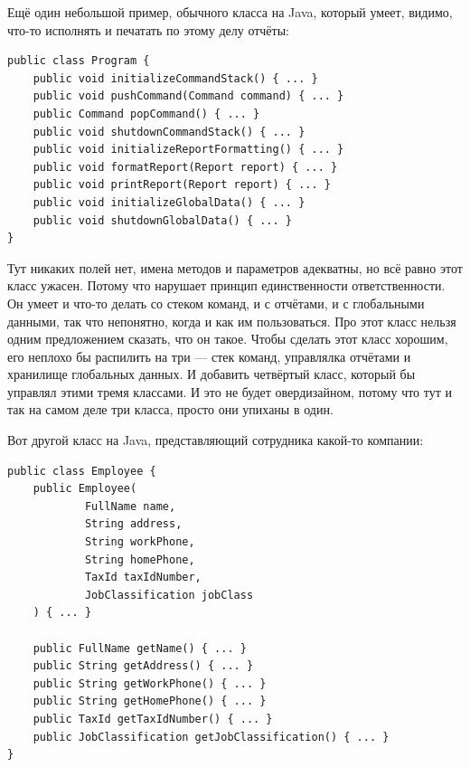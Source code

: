 \documentclass{../../text-style}
\begin{document}
Ещё один небольшой пример, обычного класса на Java, который умеет, видимо, что-то исполнять и печатать по этому делу отчёты:

\begin{verbatim}
public class Program {
    public void initializeCommandStack() { ... }
    public void pushCommand(Command command) { ... }
    public Command popCommand() { ... }
    public void shutdownCommandStack() { ... }
    public void initializeReportFormatting() { ... }
    public void formatReport(Report report) { ... }
    public void printReport(Report report) { ... }
    public void initializeGlobalData() { ... }
    public void shutdownGlobalData() { ... }
}
\end{verbatim}

Тут никаких полей нет, имена методов и параметров адекватны, но всё равно этот класс ужасен. Потому что нарушает принцип единственности ответственности. Он умеет и что-то делать со стеком команд, и с отчётами, и с глобальными данными, так что непонятно, когда и как им пользоваться. Про этот класс нельзя одним предложением сказать, что он такое. Чтобы сделать этот класс хорошим, его неплохо бы распилить на три --- стек команд, управлялка отчётами и хранилище глобальных данных. И добавить четвёртый класс, который бы управлял этими тремя классами. И это не будет овердизайном, потому что тут и так на самом деле три класса, просто они упиханы в один.

Вот другой класс на Java, представляющий сотрудника какой-то компании:

\begin{verbatim}
public class Employee {
    public Employee(
            FullName name,
            String address,
            String workPhone,
            String homePhone,
            TaxId taxIdNumber,
            JobClassification jobClass
    ) { ... }

    public FullName getName() { ... }
    public String getAddress() { ... }
    public String getWorkPhone() { ... }
    public String getHomePhone() { ... }
    public TaxId getTaxIdNumber() { ... }
    public JobClassification getJobClassification() { ... }
}
\end{verbatim}
\end{document}
